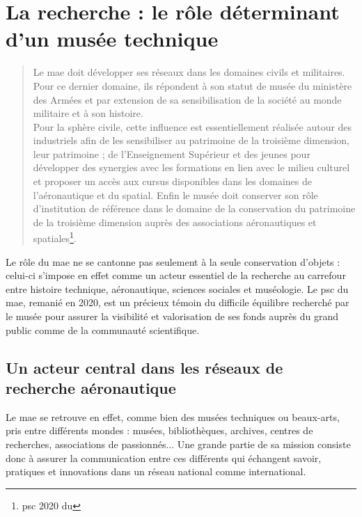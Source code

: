 \section{\label{I-A-2}La recherche : le rôle déterminant d'un musée technique}

\begin{quote}
	\og Le \acf{mae} doit développer ses réseaux \textelp{} dans les domaines civils et militaires. Pour ce dernier domaine, ils répondent à son statut de musée du ministère des Armées et par extension de sa sensibilisation de la société au monde militaire et à son histoire.\\
	Pour la sphère civile, cette influence est essentiellement réalisée autour des industriels afin de les sensibiliser au patrimoine de la troisième dimension, leur patrimoine ; de l’Enseignement Supérieur et des jeunes pour développer des synergies avec les formations en lien avec le milieu culturel et proposer un accès aux cursus disponibles dans les domaines de l’aéronautique et du spatial. Enfin \textelp{} le musée doit conserver son rôle d’institution de référence dans le domaine de la conservation du patrimoine de la troisième dimension auprès des associations aéronautiques et spatiales\footnote{\Ac{psc} 2020 du \mae}.\fg
\end{quote}


Le rôle du \ac{mae} ne se cantonne pas seulement à la seule conservation d’objets : celui-ci s'impose en effet comme un acteur essentiel de la recherche au carrefour entre histoire technique, aéronautique, sciences sociales et muséologie.  Le \ac{psc} du \acf{mae}, remanié en 2020, est un précieux témoin du difficile équilibre recherché par le musée pour assurer la visibilité et valorisation de ses fonds auprès du grand public comme de la communauté scientifique.

\subsection{Un acteur central dans les réseaux de recherche aéronautique}

Le \ac{mae} se retrouve en effet, comme bien des musées techniques ou beaux-arts, pris entre différents mondes : musées, bibliothèques, archives, centres de recherches, associations de passionnés... Une grande partie de sa mission consiste donc à assurer la communication entre ces différents qui échangent savoir, pratiques et innovations dans un réseau national comme international.

